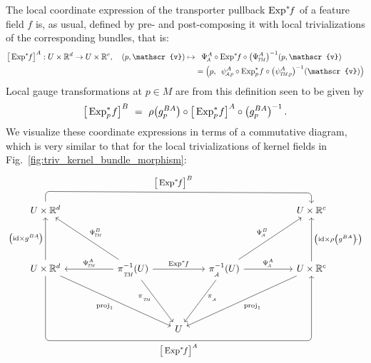 The local coordinate expression of the transporter pullback $\operatorname{Exp}^*\mkern-5mu f$ of a feature field $f$ is, as usual, defined by pre- and post-composing it with local trivializations of the corresponding bundles, that is:
\begin{align}\label{eq:kft_coordinate_expression_62}
    \big[\Expsf \big]^A: U\times \R^d \to U\times \R^c,\ \ \ 
    (p,\mathscr{v}) \mapsto&\phantom{=} \PsiA^A \circ \Expsf \circ \big(\PsiTM^A \big)^{-1} (p, \mathscr{v}) \notag \\
                           &= \pig(p,\,\ \psiAp^A \circ \Expspf \circ \big(\psiTMp^A \big)^{-1} (\mathscr{v}) \pig)
\end{align}
Local gauge transformations at $p\in M$ are from this definition seen to be given by
\begin{align}
    \big[\operatorname{Exp}^*_p\mkern-2mu f \big]^B \ =\ \rho\big( g_p^{BA}\big) \circ \big[\operatorname{Exp}^*_p\mkern-2mu f \big]^A \circ \big(g_p^{BA}\big)^{-1} \,.
\end{align}
We visualize these coordinate expressions in terms of a commutative diagram, which is very similar to that for the local trivializations of kernel fields in Fig.~\ref{fig:triv_kernel_bundle_morphism}:
\begin{equation}
\begin{tikzcd}[row sep=4.5em, column sep=5.2em]
      U\times\R^d
                    \arrow[rrrr, pos=.48, rounded corners, to path={ 
                            -- ([yshift=2.5ex]\tikztostart.north) 
                            --node[above]{\small$
                                \big[\Expsf \big]^B
                            $} ([yshift=2.5ex]\tikztotarget.north) 
                            -- (\tikztotarget.north)
                            }]
    & &[-3.25em] &[-3.25em] &
    U\times\R^c
    \\
    U\times\R^d
                    \arrow[u, "\big(\id\times g^{BA}\!\!\cdot\big)"]
                    \arrow[rrd, "\proj_1"']
                    \arrow[rrrr, pos=.5, rounded corners, to path={ 
                            -- ([yshift=-16.ex]\tikztostart.south) 
                            --node[below]{\small$
                                \big[\Expsf \big]^A
                            $} ([yshift=-16.ex]\tikztotarget.south) 
                            -- (\tikztotarget.south)
                            }]
    &
    \piTM^{-1}(U)   
                    \arrow[rd, "\piTM\!\!"', pos=0.3]
                    \arrow[rr, "\Expsf"]
                    \arrow[lu, "\PsiTM^B"']
                    \arrow[l,  "\PsiTM^A"']
    & &
    \piA^{-1}(U)
                    \arrow[ld, "\!\piA", pos=0.3]
                    \arrow[r,  "\PsiA^A"]
                    \arrow[ru, "\PsiA^B"]
    &
    U\times\R^c
                    \arrow[u, "\big(\id\times \rho\big(g^{BA}\big)\!\cdot\big)"']
    \arrow[lld, "\proj_1"] \\
    & &
    U
    & &
\end{tikzcd}
\end{equation}

